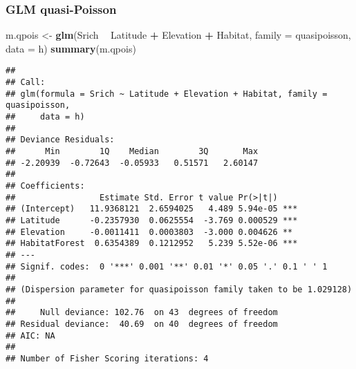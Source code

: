 \documentclass[
]{book}
\newenvironment{Shaded}{\begin{snugshade}}{\end{snugshade}}
\newcommand{\CommentTok}[1]{\textcolor[rgb]{0.56,0.35,0.01}{\textit{#1}}}
\newcommand{\DataTypeTok}[1]{\textcolor[rgb]{0.13,0.29,0.53}{#1}}
\newcommand{\DecValTok}[1]{\textcolor[rgb]{0.00,0.00,0.81}{#1}}
\newcommand{\KeywordTok}[1]{\textcolor[rgb]{0.13,0.29,0.53}{\textbf{#1}}}
\newcommand{\NormalTok}[1]{#1}
\newcommand{\OperatorTok}[1]{\textcolor[rgb]{0.81,0.36,0.00}{\textbf{#1}}}
\newcommand{\StringTok}[1]{\textcolor[rgb]{0.31,0.60,0.02}{#1}}
\begin{document}
\hypertarget{glm-quasi-poisson}{%
\subsubsection{GLM quasi-Poisson}\label{glm-quasi-poisson}}

\begin{Shaded}
\begin{Highlighting}[]
\NormalTok{m.qpois <-}\StringTok{ }\KeywordTok{glm}\NormalTok{(Srich }\OperatorTok{~}\StringTok{ }\NormalTok{Latitude }\OperatorTok{+}\StringTok{ }\NormalTok{Elevation }\OperatorTok{+}\StringTok{ }\NormalTok{Habitat, }\DataTypeTok{family =}\NormalTok{ quasipoisson, }\DataTypeTok{data =}\NormalTok{ h)}
\KeywordTok{summary}\NormalTok{(m.qpois)}
\end{Highlighting}
\end{Shaded}

\begin{verbatim}
## 
## Call:
## glm(formula = Srich ~ Latitude + Elevation + Habitat, family = quasipoisson, 
##     data = h)
## 
## Deviance Residuals: 
##      Min        1Q    Median        3Q       Max  
## -2.20939  -0.72643  -0.05933   0.51571   2.60147  
## 
## Coefficients:
##                 Estimate Std. Error t value Pr(>|t|)    
## (Intercept)   11.9368121  2.6594025   4.489 5.94e-05 ***
## Latitude      -0.2357930  0.0625554  -3.769 0.000529 ***
## Elevation     -0.0011411  0.0003803  -3.000 0.004626 ** 
## HabitatForest  0.6354389  0.1212952   5.239 5.52e-06 ***
## ---
## Signif. codes:  0 '***' 0.001 '**' 0.01 '*' 0.05 '.' 0.1 ' ' 1
## 
## (Dispersion parameter for quasipoisson family taken to be 1.029128)
## 
##     Null deviance: 102.76  on 43  degrees of freedom
## Residual deviance:  40.69  on 40  degrees of freedom
## AIC: NA
## 
## Number of Fisher Scoring iterations: 4
\end{verbatim}

\begin{Shaded}
\end{Shaded}
\end{document}
